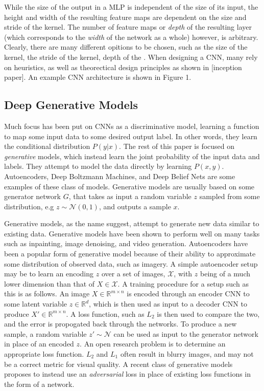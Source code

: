 \documentclass{article}
\begin{document}
\noindent While the size of the output in a MLP is independent of the size of its input,
the height and width of the resulting feature maps are dependent on the size and stride of the kernel. The number of feature maps or \textit{depth} of the
resulting layer (which corresponds to the \textit{width} of the network as a whole) however, is arbitrary. Clearly, there are many different opitions to be chosen,
such as the size of the kernel, the stride of the kernel, depth of the . When designing a CNN, many rely on heuristics, as well as theorectical
design principles as shown in [inception paper]. An example CNN architecture is shown in Figure 1. \newline

\subsection{Deep Generative Models}
\noindent Much focus has been put on CNNs as a discriminative model, learning a function to map some input data to some desired output label. In other words,
they learn the conditional distribution $P(y|x)$. The rest of this paper is focused on \textit{generative} models, which instead learn the joint
probability of the input data and labels. They attempt to model the data directly by learning $P(x,y)$. Autoencoders, Deep Boltzmann Machines, and
Deep Belief Nets are some examples of these class of models. Generative models are usually based on some generator network $G$, that takes as input
a random variable $z$ sampled from some distribution, e.g $z \sim \mathcal{N}(0,1)$, and outputs a sample $x$. \newline

\noindent Generative models, as the name suggest, attempt to generate new data similar to existing data. Generative models have been shown to perform
well on many tasks such as inpainting, image denoising, and video generation. Autoencoders have been a popular form of generative model because of their
ability to approximate some distribution of observed data, such as imagery. A simple autoencoder setup may be to learn an encoding $z$ over a set of images,
$\mathcal{X}$, with $z$ being of a much lower dimension than that of $X \in{\mathcal{X}}$. A training procedure for a setup such as this is as follows.
An image $X \in{\mathbb{R}^{m\times n}}$ is encoded through an encoder CNN to some latent variable $z \in{\mathbb{R}^{d}}$, which is then used as input to a
decoder CNN to produce $X' \in{\mathbb{R}^{m\times n}}$. A loss function, such as $L_2$ is then used to compare the two, and the error is propogated back through
the networks. To produce a new sample, a random variable $z' \sim \mathcal{N}$ can be used as input to the generator network in place of an encoded $z$. 
An open research problem is to determine an appropriate loss function. $L_2$ and $L_1$ often result in blurry images, and may not be a correct metric for
visual quality. A recent class of generative models proposes to instead use an \textit{adversarial} loss in place of existing loss functions in the form of
a network.
\end{document}

